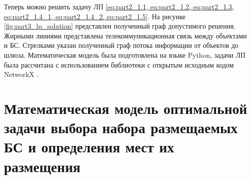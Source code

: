 Теперь можно решить задачу ЛП \cref{eq:part2_1.1, eq:part2_1.2, eq:part2_1.3, eq:part2_1.4_1, eq:part2_1.4_2, eq:part2_1.5}. На рисунке \cref{fig:part3_lp_solution} представлен полученный граф допустимого решения. Жирными линиями представлена телекоммуникационная связь между объектами и БС. Стрелками указан полученный граф потока информации от объектов до шлюза. Математическая модель была подготовлена на языке Python, задачи ЛП была рассчитана с использованием библиотеки с открытым исходным кодом NetworkX \cite{networkx}. 










\FloatBarrier
\section{Математическая модель оптимальной задачи выбора набора размещаемых БС и определения мест их размещения}

